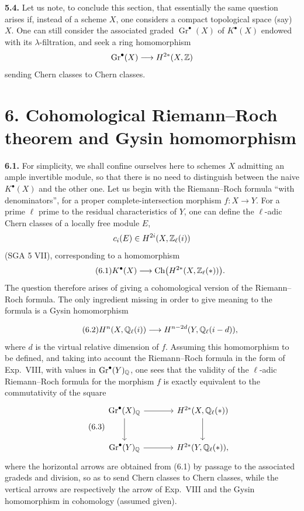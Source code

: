 \noindent\textbf{5.4.}
Let us note, to conclude this section, that essentially the same question
arises if, instead of a scheme $X$, one considers a compact topological
space (say) $X$. One can still consider the associated graded
$\operatorname{Gr}^\bullet(X)$ of $K^\bullet(X)$ endowed with its
$\lambda$-filtration, and seek a ring homomorphism
\[
 \operatorname{Gr}^\bullet(X)\longrightarrow H^{2*}(X,\mathbb Z)
\]
sending Chern classes to Chern classes.

\section*{6. Cohomological Riemann--Roch theorem and Gysin homomorphism}

\noindent\textbf{6.1.}
For simplicity, we shall confine ourselves here to schemes $X$ admitting an
ample invertible module, so that there is no need to distinguish between the
naive $K^\bullet(X)$ and the other one. Let us begin with the Riemann--Roch
formula ``with denominators'', for a proper complete-intersection morphism
$f:X\longrightarrow Y$. For a prime $\ell$ prime to the residual
characteristics of $Y$, one can define the $\ell$-adic Chern classes of a
locally free module $E$,
\[
 c_i(E)\in H^{2i}(X,\mathbb Z_\ell(i))
\]
(SGA 5 VII), corresponding to a homomorphism
\begin{equation}\tag{6.1}
 K^\bullet(X)\longrightarrow \operatorname{Ch}\bigl(H^{2*}(X,\mathbb Z_\ell(*))\bigr).
\end{equation}
The question therefore arises of giving a cohomological version of the
Riemann--Roch formula. The only ingredient missing in order to give meaning
to the formula is a Gysin homomorphism

\begin{equation}\tag{6.2}
 H^n(X,\mathbb Q_\ell(i))\longrightarrow H^{n-2d}(Y,\mathbb Q_\ell(i-d)),
\end{equation}
where $d$ is the virtual relative dimension of $f$. Assuming this
homomorphism to be defined, and taking into account the Riemann--Roch formula
in the form of Exp.~VIII, with values in
$\operatorname{Gr}^\bullet(Y)_{\mathbb Q}$, one sees that the validity of the
$\ell$-adic Riemann--Roch formula for the morphism $f$ is exactly equivalent
to the commutativity of the square
\begin{equation}\tag{6.3}
\begin{tikzcd}[column sep=large,row sep=large]
 \operatorname{Gr}^\bullet(X)_{\Q} \arrow[r] \arrow[d]
   & H^{2*}(X,\Qell(*)) \arrow[d] \\
 \operatorname{Gr}^\bullet(Y)_{\Q} \arrow[r]
   & H^{2*}(Y,\Qell(*)),
\end{tikzcd}
\end{equation}
where the horizontal arrows are obtained from (6.1) by passage to the
associated gradeds and division, so as to send Chern classes to Chern
classes, while the vertical arrows are respectively the arrow of Exp.~VIII
and the Gysin homomorphism in cohomology (assumed given).

